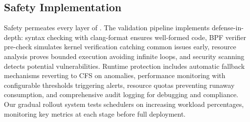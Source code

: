 \subsection{Safety Implementation}

Safety permeates every layer of \sys. The validation pipeline implements defense-in-depth: syntax checking with clang-format ensures well-formed code, BPF verifier pre-check simulates kernel verification catching common issues early, resource analysis proves bounded execution avoiding infinite loops, and security scanning detects potential vulnerabilities. Runtime protection includes automatic fallback mechanisms reverting to CFS on anomalies, performance monitoring with configurable thresholds triggering alerts, resource quotas preventing runaway consumption, and comprehensive audit logging for debugging and compliance. Our gradual rollout system tests schedulers on increasing workload percentages, monitoring key metrics at each stage before full deployment.
